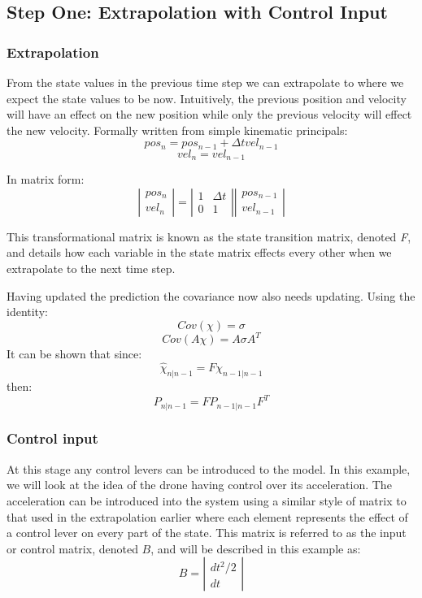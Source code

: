\subsection{Step One: Extrapolation with Control Input}
\subsubsection{Extrapolation}
From the state values in the previous time step we can extrapolate to where we expect the state values to be now. Intuitively, the previous position and velocity will have an effect on the new position while only the previous velocity will effect the new velocity. Formally written from simple kinematic principals:
\[pos_n = pos_{n-1} + \Delta t vel_{n-1}\]
\[vel_n = vel_{n-1}\]

In matrix form:
\[\left |  \begin{array}{c}
pos_n \\
vel_n
\end{array}  \right |
= 
\left |  \begin{array}{cc}
1 & \Delta t \\
0 & 1
\end{array}  \right |
\left |  \begin{array}{c}
pos_{n-1} \\
vel_{n-1}
\end{array}  \right |\]

This transformational matrix is known as the state transition matrix, denoted \textit{F},  and details how each variable in the state matrix effects every other when we extrapolate to the next time step.\par 
	Having updated the prediction the covariance now also needs updating. Using the identity:
\[Cov(\chi) = \sigma\]
\[Cov(A\chi) = A \sigma A^T\]
It can be shown that since:
\[\hat{\chi}_{n|n-1} = F\chi_{n-1|n-1} \]
then:
\[P_{n|n-1} = FP_{n-1|n-1}F^T\]

\subsubsection{Control input}
	At this stage any control levers can be introduced to the model. In this example, we will look at the idea of the drone having control over its acceleration. The acceleration can be introduced into the system using a similar style of matrix to that used in the extrapolation earlier where each element represents the effect of a control lever on every part of the state. This matrix is referred to as the input or control matrix, denoted \(B\), and will be described in this example as:
\[B
=
\left |  \begin{array}{c}
dt^2/2 \\
dt
\end{array}  \right |\]

